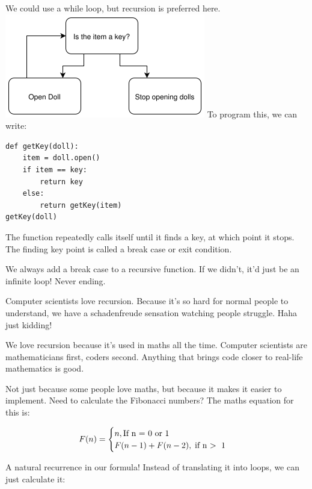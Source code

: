 \documentclass{article}
\begin{document}
We could use a while loop, but recursion is preferred here.
\includegraphics[width=\textwidth,height=\textheight,keepaspectratio]{f.png}
To program this, we can write:
\begin{verbatim}
def getKey(doll):
	item = doll.open()
    if item == key:
    	return key
	else:
    	return getKey(item)
getKey(doll)
\end{verbatim}

The function repeatedly calls itself until it finds a key, at which point it stops. The finding key point is called a break case or exit condition.

We always add a break case to a recursive function. If we didn't, it'd just be an infinite loop! Never ending. 

Computer scientists love recursion. Because it's so hard for normal people to understand, we have a schadenfreude sensation watching people struggle. Haha just kidding!

We love recursion because it's used in maths all the time. Computer scientists are mathematicians first, coders second. Anything that brings code closer to real-life mathematics is good. 

Not just because some people love maths, but because it makes it easier to implement. Need to calculate the Fibonacci numbers? The maths equation for this is:



$$F(n) = \begin{cases} n, \text{If n = 0 or 1} \\ F(n - 1) + F(n - 2), \; \text{if n \textgreater \; 1} \end{cases}$$

A natural recurrence in our formula! Instead of translating it into loops, we can just calculate it:
\end{document}
